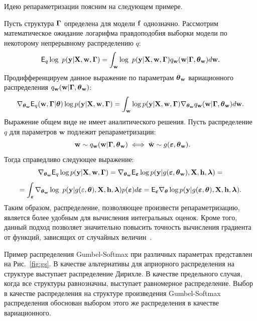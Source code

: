 Идею репараметризации поясним на следующем примере.
\begin{example} Пусть структура $\G$ определена для модели $\model$ однозначно. Рассмотрим математическое ожидание логарифма правдоподобия выборки модели по некоторому непрерывному распределению $q$:
\[
    \E_q \log~\LL=  \int_{\w} \log~\LL \qw d\w.
\]
Продифференцируем данное выражение по параметрам $\tetaw$ вариационного распределения $\qw$:
\[
    \nabla_{\tetaw} \E_\q \log \LL = 
\int_{\w}  \log \LL \nabla_{\tetaw}\qw d\w.
\]
Выражение общем виде не имеет аналитического решения. Пусть распределение $q$ для параметров $\mathbf{w}$ подлежит репараметризации:
\[
    \w \sim \qw \iff \hat{\w} \sim g(\boldsymbol{\varepsilon},\tetaw).
\] 
Тогда справедливо следующее выражение:
\[
 \nabla_{\tetaw} \E_q \log \LL = \nabla_{\tetaw} \E_{\boldsymbol{\varepsilon}} \log p(\y|g(\boldsymbol{\varepsilon}, \tetaw), \X, \h, \lam) =
\]
\[= \int_{\boldsymbol{\varepsilon}}\nabla_{\tetaw} \log~p(\y|g(\varepsilon,\teta), \X, \h,\lam) p(\boldsymbol{\varepsilon}) d\boldsymbol{\varepsilon}=\E_{\boldsymbol{\varepsilon}} \nabla_{\teta} \log p(\y|g(\boldsymbol{\varepsilon}, \teta), \X, \h, \lam).\]
Таким образом, распределение, позволяющее произвести репараметризацию, является более удобным для вычисления интегральных оценок.
Кроме того, данный подход позволяет значительно повысить точность вычисления градиента от функций, зависящих от случайных величин~\cite{reparametrization}.
\end{example}

Пример распределения Gumbel-Softmax при различных параметрах представлен на Рис.~\ref{fig:gs}. В качестве альтернативы для априорного распределения на структуре выступает  распределение Дирихле. В качестве предельного случая, когда все структуры равнозначны, выступает равномерное распределение. Выбор в качестве распределения на структуре произведения Gumbel-Softmax распределения обоснован выбором этого же распределения в качестве вариационного. 

